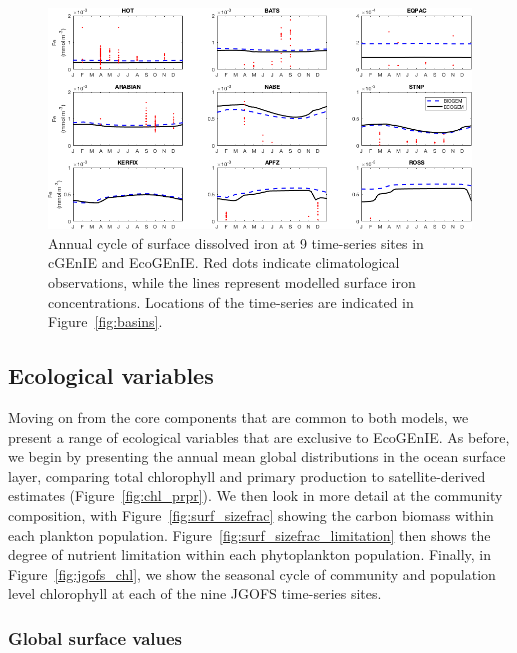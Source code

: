 \documentclass[gmd, manuscript]{copernicus}
\begin{document}
{\begin{figure}[htbp]
\begin{center}
\includegraphics[width=\linewidth]{Final_figures/Fig_13.png}
\caption{Annual cycle of surface dissolved iron at 9 time-series sites in cGEnIE and EcoGEnIE. Red dots indicate climatological observations, while the 
lines represent modelled surface iron concentrations. Locations of the time-series are indicated in Figure~\ref{fig:basins}.}
\label{fig:jgofs_fe}
\end{center}
\end{figure}

\clearpage
\subsection{Ecological variables}

Moving on from the core components that are common to both models, we present a range of ecological variables that are exclusive to EcoGEnIE. As before, we begin by presenting the annual mean global distributions in the ocean surface layer, comparing total chlorophyll and primary production to satellite-derived estimates (Figure~\ref{fig:chl_prpr}). We then look in more detail at the community composition, with Figure~\ref{fig:surf_sizefrac} showing the carbon biomass within each plankton population. Figure~\ref{fig:surf_sizefrac_limitation} then shows the degree of nutrient limitation within each phytoplankton population. Finally, in Figure~\ref{fig:jgofs_chl}, we show the seasonal cycle of community and population level chlorophyll at each of the nine JGOFS time-series sites.

\subsubsection{Global surface values}

}
\end{document}
